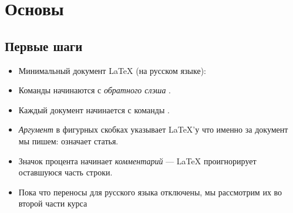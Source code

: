 \documentclass{beamer}
\begin{document}
\section{Основы}

\subsection{Первые шаги}

\begin{frame}[fragile]{\insertsubsection}
\vspace{-2ex}
\begin{itemize}
  \item Минимальный документ \LaTeX{} (на русском языке):

\item Команды начинаются с \emph{обратного слэша} \keystrokebftt{\bs}.
\item Каждый документ начинается с команды .
\item \emph{Аргумент} в фигурных скобках \keystrokebftt{\{} \keystrokebftt{\}}
  указывает \LaTeX'у что именно за документ мы пишем:  означает статья.
\item Значок процента \keystrokebftt{\%} начинает \emph{комментарий} --- \LaTeX{}
проигнорирует оставшуюся часть строки.
\item Пока что переносы для русского языка отключены, мы рассмотрим их во
  второй части курса
\end{itemize}
\end{frame}
\end{document}
